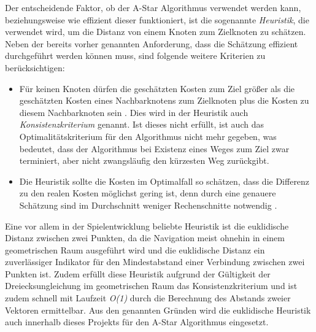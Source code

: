Der entscheidende Faktor, ob der A-Star Algorithmus verwendet werden kann, beziehungsweise wie effizient dieser funktioniert, ist die sogenannte \textit{Heuristik}, die verwendet wird, um die Distanz von einem Knoten zum Zielknoten zu schätzen. Neben der bereits vorher genannten Anforderung, dass die Schätzung effizient durchgeführt werden können muss, sind folgende weitere Kriterien zu berücksichtigen:
\begin{itemize}
	\item Für keinen Knoten dürfen die geschätzten Kosten zum Ziel größer als die geschätzten Kosten eines Nachbarknotens zum Zielknoten plus die Kosten zu diesem Nachbarknoten sein \cite[S. 98]{ai_modern_approach}. Dies wird in der Heuristik auch \textit{Konsistenzkriterium} genannt. Ist dieses nicht erfüllt, ist auch das Optimalitätskriterium für den Algorithmus nicht mehr gegeben, was bedeutet, dass der Algorithmus bei Existenz eines Weges zum Ziel zwar terminiert, aber nicht zwangsläufig den kürzesten Weg zurückgibt.
	\item Die Heuristik sollte die Kosten im Optimalfall so schätzen, dass die Differenz zu den realen Kosten möglichst gering ist, denn durch eine genauere Schätzung sind im Durchschnitt weniger Rechenschnitte notwendig \cite[S. 98]{ai_modern_approach}.
\end{itemize}
Eine vor allem in der Spielentwicklung beliebte Heuristik ist die euklidische Distanz zwischen zwei Punkten, da die Navigation meist ohnehin in einem geometrischen Raum ausgeführt wird und die euklidische Distanz ein zuverlässiger Indikator für den Mindestabstand einer Verbindung zwischen zwei Punkten ist. Zudem erfüllt diese Heuristik aufgrund der Gültigkeit der Dreiecksungleichung im geometrischen Raum das Konsistenzkriterium und ist zudem schnell mit Laufzeit \textit{O(1)} durch die Berechnung des Abstands zweier Vektoren ermittelbar. Aus den genannten Gründen wird die euklidische Heuristik auch innerhalb dieses Projekts für den A-Star Algorithmus eingesetzt.

